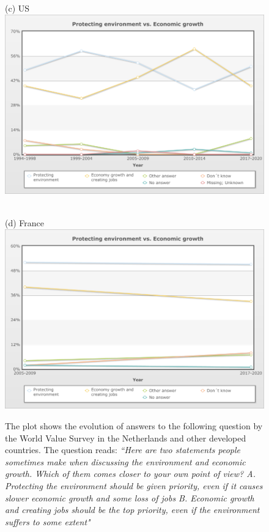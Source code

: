 \documentclass[12pt]{article}
\begin{document}
\begin{figure}[h!!]
	\begin{minipage}[h!!]{0.4\textwidth}  
		\centering\footnotesize{(c) US}
		\includegraphics[width=1\textwidth]{../Data/data_US_priorities.png}
	\end{minipage}
	\begin{minipage}[h!!]{0.4\textwidth}  
		\centering\footnotesize{ \ \\ (d) France}
		\includegraphics[width=1\textwidth]{../Data/data_France_priorities.png}
	\end{minipage}
	\caption{The plot shows the evolution of answers to the following question by the World Value Survey in the Netherlands and other developed countries. The question reads: \textit{``Here are two statements people sometimes make when discussing the environment and
			economic growth. Which of them comes closer to your own point of view? A. Protecting
			the environment should be given priority, even if it causes slower economic growth and
			some loss of jobs B. Economic growth and creating jobs should be the top priority, even
			if the environment suffers to some extent"}}\label{fig:WVS}
\end{figure}
\end{document}
